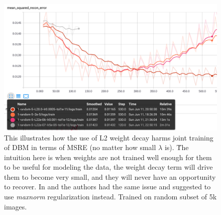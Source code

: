 \clearpage

\begin{figure}[h]
\begin{mdframed}
\centering
\includegraphics[width=6in]{dbm-mnist/L2_5k.png}
\caption{This illustrates how the use of L2 weight decay harms joint training of DBM in terms of MSRE (no matter how small $\lambda$ is). \u{The intuition} here is when weights are not trained well enough for them to be useful for modeling the data, the weight decay term will drive them to become very small, and they will never have an opportunity to recover. In \cite{goodfellow2013joint} and \cite{goodfellow2013multi} the authors had the same issue and suggested to use \emph{maxnorm} regularization instead. Trained on random subset of 5k images.}
\end{mdframed}
\end{figure}

\clearpage

